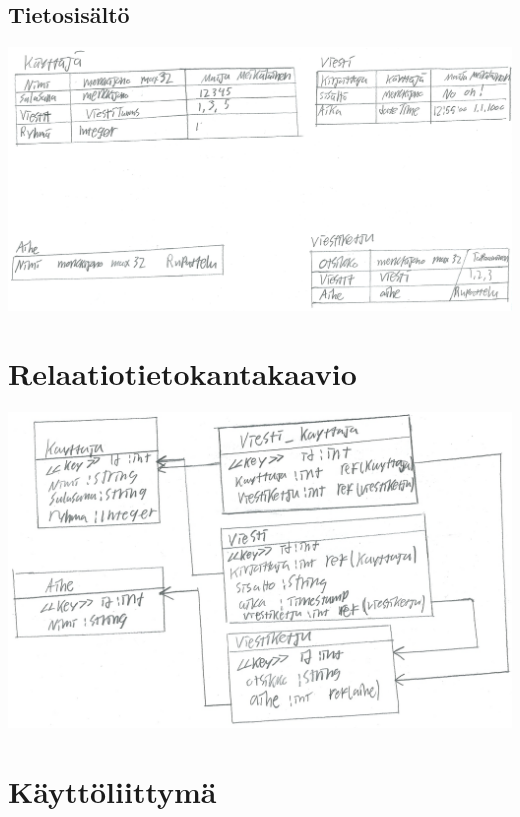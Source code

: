 \documentclass[a4paper, 12pt, finnish]{article}
\begin{document}
\subsection{Tietosisältö}
\includegraphics[width=\textwidth,height=\textheight,keepaspectratio]{tietosisalto.png}

\newpage

\section{Relaatiotietokantakaavio}
\includegraphics[width=\textwidth,height=\textheight,keepaspectratio]{relaatiotietokantakaavio.png}

\newpage

\section{Käyttöliittymä}
\end{document}
